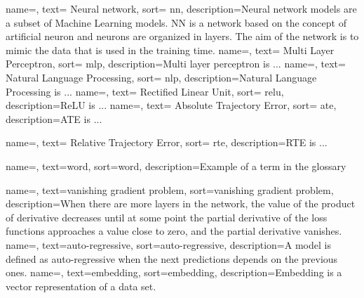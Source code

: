 {
    name=,
    text= Neural network,
    sort= nn,
    description={Neural network models are a subset of Machine Learning models. NN is a network based on the concept of artificial neuron and neurons are organized in layers. The aim of the network is to mimic the data that is used in the training time. }
}
{
    name=,
    text= Multi Layer Perceptron,
    sort= mlp,
    description={Multi layer perceptron is ...}
}
{
    name=,
    text= Natural Language Processing,
    sort= nlp,
    description={Natural Language Processing is ...}
}
{
    name=,
    text= Rectified Linear Unit,
    sort= relu,
    description={ReLU is ...} %
}
{
    name=,
    text= Absolute Trajectory Error,
    sort= ate,
    description={ATE is ...} %
}

{
    name=,
    text= Relative Trajectory Error,
    sort= rte,
    description={RTE is ...} %
}




{
    name=,
    text=word,
    sort=word,
    description={Example of a term in the glossary}
}

{
    name=,
    text=vanishing gradient problem,
    sort=vanishing gradient problem,
    description={When there are more layers in the network, the value of the product of derivative decreases until at some point the partial derivative of the loss functions approaches a value close to zero, and the partial derivative vanishes.}
}
{
    name=,
    text=auto-regressive,
    sort=auto-regressive,
    description={A model is defined as auto-regressive when the next predictions depends on the previous ones.} %
}
{
    name=,
    text=embedding,
    sort=embedding,
    description={Embedding is a vector representation of a data set.}
}
